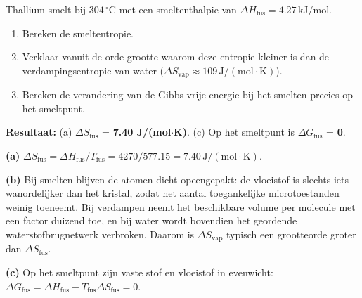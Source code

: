 \begin{oefening}
Thallium smelt bij \(304\,^\circ\mathrm{C}\) met een smeltenthalpie van \(\Delta H_{\text{fus}} = 4.27\,\mathrm{kJ/mol}\).

\begin{enumerate}
\item[(a)]
  Bereken de smeltentropie.
\item[(b)]
  Verklaar vanuit de orde-grootte waarom deze entropie kleiner is dan de verdampingsentropie van water (\(\Delta S_{\text{vap}} \approx 109\,\mathrm{J/(mol\cdot K)}\)).
\item[(c)]
  Bereken de verandering van de Gibbs-vrije energie bij het smelten precies op het smeltpunt.
\end{enumerate}
\end{oefening}
\begin{oplossing}
\textbf{Resultaat:} (a) \(\Delta S_{\text{fus}}\) = \textbf{7.40 J/(mol\ensuremath{\cdot{}}K)}. (c) Op het smeltpunt is \(\Delta G_{\text{fus}}\) = \textbf{0}.

\textbf{(a)} \(\Delta S_{\text{fus}} = \Delta H_{\text{fus}}/T_{\text{fus}} = 4270/577.15 = 7.40\,\mathrm{J/(mol\cdot K)}\).

\textbf{(b)} Bij smelten blijven de atomen dicht opeengepakt: de vloeistof is slechts iets wanordelijker dan het kristal, zodat het aantal toegankelijke microtoestanden weinig toeneemt. Bij verdampen neemt het beschikbare volume per molecule met een factor duizend toe, en bij water wordt bovendien het geordende waterstofbrugnetwerk verbroken. Daarom is \(\Delta S_{\text{vap}}\) typisch een grootteorde groter dan \(\Delta S_{\text{fus}}\).

\textbf{(c)} Op het smeltpunt zijn vaste stof en vloeistof in evenwicht: \(\Delta G_{\text{fus}} = \Delta H_{\text{fus}} - T_{\text{fus}}\Delta S_{\text{fus}} = 0\).
\end{oplossing}

